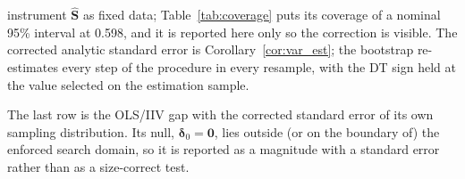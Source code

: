 \begin{table}[htbp]
\begin{threeparttable}
\begin{tablenotes}
instrument $\widehat{\mathbf S}$ as fixed data; Table~\ref{tab:coverage} puts
its coverage of a nominal 95\% interval at 0.598, and it is reported here
only so the correction is visible. The corrected analytic standard error is
Corollary~\ref{cor:var_est}; the bootstrap re-estimates every step of the
procedure in every resample, with the DT sign held at the value selected on
the estimation sample.
\item The last row is the OLS/IIV gap with the corrected standard error
of its own sampling distribution. Its null, $\boldsymbol\delta_0=\mathbf 0$,
lies outside (or on the boundary of) the enforced search domain, so it is
reported as a magnitude with a standard error rather than as a
size-correct test.
\end{tablenotes}
\end{threeparttable}
\end{table}
